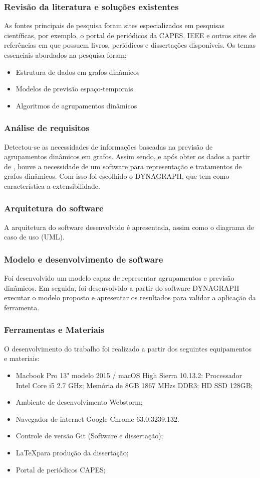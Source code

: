 \subsubsection{Revisão da literatura e soluções existentes}
As fontes principais de pesquisa foram sites especializados em pesquisas científicas, por exemplo, o portal de periódicos
da CAPES, IEEE e outros sites de referências em que possuem livros, periódicos e dissertações disponíveis.
Os temas essenciais abordados na pesquisa foram:
\begin{itemize}
	\item Estrutura de dados em grafos dinâmicos
	\item Modelos de previsão espaço-temporais
	\item Algoritmos de agrupamentos dinâmicos
\end{itemize}
\subsubsection{Análise de requisitos}
Detectou-se as necessidades de informações baseadas na previsão de agrupamentos dinâmicos
em grafos. Assim sendo, e após obter os dados a partir de \cite{simda}, houve a necessidade de um software para
representação e tratamentos de grafos dinâmicos. Com isso foi escolhido o DYNAGRAPH, que tem como 
característica a extensibilidade.

\subsubsection{Arquitetura do software}
A arquitetura do software desenvolvido é apresentada, assim como o diagrama de caso de uso (UML).

\subsubsection{Modelo e desenvolvimento de software}
Foi desenvolvido um modelo capaz de representar agrupamentos e previsão dinâmicos.
Em seguida, foi desenvolvido a partir do software DYNAGRAPH executar o modelo
proposto e apresentar os resultados para validar a aplicação da ferramenta.

\subsubsection{Ferramentas e Materiais}
O desenvolvimento do trabalho foi realizado a partir dos seguintes equipamentos e materiais:
\begin{itemize}
	\item Macbook Pro 13" modelo 2015 / macOS High Sierra 10.13.2:
	\subitem Processador Intel Core i5 2.7 GHz;
	\subitem Memória de 8GB 1867 MHzs DDR3;
	\subitem HD SSD 128GB;
	\item Ambiente de desenvolvimento Webstorm;
	\item Navegador de internet Google Chrome 63.0.3239.132.
	\item Controle de versão Git (Software e dissertação);
	\item \LaTeX para produção da dissertação;
	\item Portal de periódicos CAPES;
\end{itemize}


